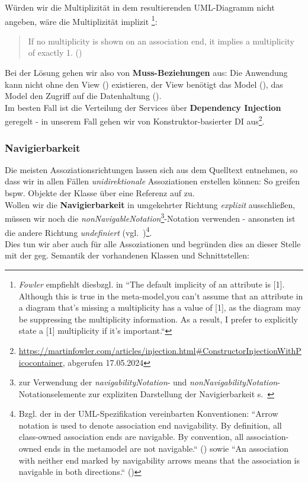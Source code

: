 \noindent
Würden wir die Multiplizität in dem resultierenden UML-Diagramm nicht angeben, wäre die Multiplizität implizit \code{[1]}\footnote{
    \textit{Fowler} empfiehlt diesbzgl. in \cite[39]{Fow03b} ``The default implicity of an attribute is [1]. Although this is true in the meta-model,you can't assume that an attribute in a diagram that's missing a multiplicity has a value of [1], as the diagram may be suppressing the multiplicity information. As a result, I prefer to explicitly state a [1] multiplicity if it's important.``
    }:
\blockquote[{\cite[19]{OMG17}}]{
If no multiplicity is shown on an association end, it implies a multiplicity of exactly 1. (\cite[19]{OMG17})
}.

\noindent
Bei der Lösung gehen wir also von \textbf{Muss-Beziehungen} aus: Die Anwendung kann nicht ohne den View () existieren, der View benötigt das Model (), das Model den Zugriff auf die Datenhaltung ().\\
Im besten Fall ist die Verteilung der Services über \textbf{Dependency Injection} geregelt - in unserem Fall gehen wir von Konstruktor-basierter DI aus\footnote{
\url{https://martinfowler.com/articles/injection.html#ConstructorInjectionWithPicocontainer}, abgerufen 17.05.2024
}.

\subsubsection*{Navigierbarkeit}
Die meisten Assoziationsrichtungen lassen sich aus dem Quelltext entnehmen, so dass wir in allen Fällen \textit{unidirektionale} Assoziationen erstellen können: So greifen bspw. Objekte der Klasse  über eine Referenz auf  zu.\\
Wollen wir die \textbf{Navigierbarkeit} in umgekehrter Richtung \textit{explizit} ausschließen, müssen wir noch die \textit{nonNavigableNotation}\footnote{
    zur Verwendung der \textit{navigabilityNotation}- und \textit{nonNavigabilityNotation}-Notationselemente zur expliziten Darstellung der Navigierbarkeit s.~\cite[203]{OMG17}
}-Notation verwenden - ansonsten ist die andere Richtung \textit{undefiniert} (vgl.~\cite[285]{Bal05})\footnote{
    Bzgl. der in der UML-Spezifikation vereinbarten Konventionen: ``Arrow notation is used to denote association end navigability. By definition, all class-owned association ends are navigable. By convention, all association-owned ends in the metamodel are not navigable.`` (\cite[18]{OMG17}) sowie ``An association with neither end marked by navigability arrows means that the association is navigable in both directions.`` (\cite[19]{OMG17})
}.\\
Dies tun wir aber auch für alle Assoziationen und begründen dies an dieser Stelle mit der geg. Semantik der vorhandenen Klassen und Schnittstellen:

